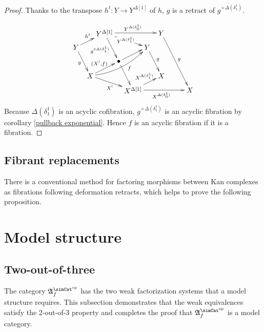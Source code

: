 \documentclass{tac}
\newcommand\hide[1]{}
\newcommand\dual{^{\mathrm{op}}}
\newcommand\s{^{\simCat\dual}}
\newcommand\bang{!}
\newcommand\of{:}
\newcommand\simplex\Delta
\newcommand\f{_f}
\newcommand\pe[1]{^{\diamond #1}}
\newcommand\ambient{\mathfrak A}
\begin{document}
\begin{proof}
Thanks to the transpose $h^t\of Y\to Y^{\simplex[1]}$ of $h$, $g$ is a retract of $g\pe{\simplex(\delta^1_1)}$.
\hide{\[\xymatrix{
Y\ar[d]_g \ar[r]^{h^t} & Y^{\simplex[1]} \ar[d]_{g\pe{\simplex(\delta^1_1)}} \ar[dr]^{Y^{\simplex(\delta^1_1)}} \ar[rr]^{Y^{\simplex(\delta^1_0)}}&& Y \ar[d]^g\\
X \ar[r]^{(X^\bang,f)} \ar[dr]_{X^\bang} \ar@/_3ex/[rr]_(.6)f & \bullet\ar[r]\ar[d] & Y \ar[d]_(.4)g & X \\
& X^{\simplex[1]} \ar[r]_{X^{\simplex(\delta_1^1)}} \ar@/_2ex/[urr]_(.7){X^{\simplex(\delta^1_0)}}& X
}\]}
\[\xy
(0,21)*+{Y}="Y0",(14,28)*+{Y^{\simplex[1]}}="Y1",(35,21)*+{Y}="Y2",(42,28)*+{Y}="Y3",
(21,14)*+{\bullet}="center",
(7,7)*+{X}="X0",(28,0)*+{X^{\simplex[1]}}="X1",(42,7)*+{X}="X2",(56,0)*+{X}="X3"
\ar_g "Y0";"X0" \ar^{h^t} "Y0";"Y1"
\ar_{g\pe{\simplex(\delta^1_1)}} "Y1";"center" \ar|{Y^{\simplex(\delta^1_1)}} "Y1";"Y2" \ar^{Y^{\simplex(\delta^1_0)}} "Y1";"Y3"
\ar^g "Y2";"X2"\ar^g "Y3";"X3"
\ar "center";"X1" \ar "center";"Y2"
\ar^{(X^\bang,f)} "X0";"center" \ar_{X^\bang} "X0";"X1" \ar@/_2ex/_(.6)f "X0";"Y2"
\ar^(.6){X^{\simplex(\delta_1^1)}} "X1";"X2" \ar_{X^{\simplex(\delta_0^1)}} "X1";"X3"
\endxy\]
Because $\simplex(\delta^1_1)$ is an acyclic cofibration, $g\pe{\simplex(\delta^1_1)}$ is an acyclic fibration by corollary \ref{pullback exponential}. Hence $f$ is an acyclic fibration if it is a fibration.
\end{proof}

\subsection{Fibrant replacements}
There is a conventional method for factoring morphisms between Kan complexes as fibrations following deformation retracts, which helps to prove the following proposition.



\section{Model structure}
\subsection{Two-out-of-three}
The category $\ambient\s\f$ has the two weak factorization systems that a model structure requires. This subsection demonstrates that the weak equivalences satisfy the 2-out-of-3 property and completes the proof that $\ambient\s\f$ is a model category.
\end{document}
